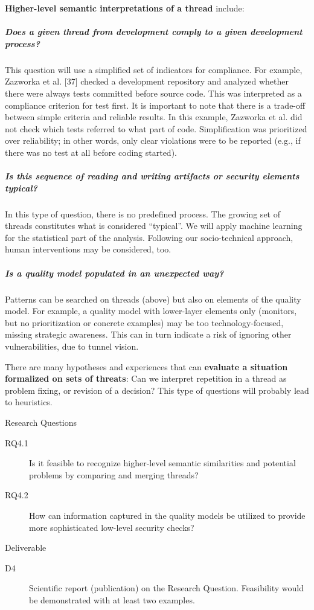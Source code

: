 \textbf{Higher-level semantic interpretations of a thread} include:

\subparagraph*{Does a given thread from development comply to a given development process?} This question will use a simplified set of indicators for compliance. For example, Zazworka et al. [37] checked a development repository and analyzed whether there were always tests committed before source code. This was interpreted as a compliance criterion for test first. It is important to note that there is a trade-off between simple criteria and reliable results. In this example, Zazworka et al. did not check which tests referred to what part of code. Simplification was prioritized over reliability; in other words, only clear violations were to be reported (e.g., if there was no test at all before coding started).

\subparagraph*{Is this sequence of reading and writing artifacts or security elements typical?} In this type of question, there is no predefined process. The growing set of threads constitutes what is considered “typical”. We will apply machine learning for the statistical part of the analysis. Following our socio-technical approach, human interventions may be considered, too.

\subparagraph{Is a quality model populated in an unexpected way?} Patterns can be searched on threads (above) but also on elements of the quality model. For example, a quality model with lower-layer elements only (monitors, but no prioritization or concrete examples) may be too technology-focused, missing strategic awareness. This can in turn indicate a risk of ignoring other vulnerabilities, due to tunnel vision.

There are many hypotheses and experiences that can \textbf{evaluate a situation formalized on sets of threats}: Can we interpret repetition in a thread as problem fixing, or revision of a decision? This type of questions will probably lead to heuristics. 

Research Questions
\begin{description}
	\item[RQ4.1]	Is it feasible to recognize higher-level semantic similarities and potential problems by comparing and merging threads?
	\item[RQ4.2]	How can information captured in the quality models be utilized to provide more sophisticated low-level security checks?
\end{description}
	
Deliverable
\begin{description}
	\item[D4]	Scientific report (publication) on the Research Question. Feasibility would be demonstrated with at least two examples.
\end{description}

